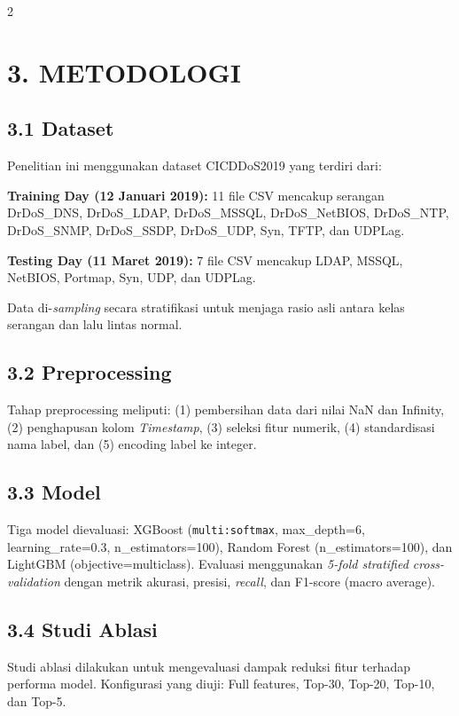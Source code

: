 \documentclass[10pt,a4paper]{article}
\begin{document}
\begin{multicols}{2}
\section*{\textbf{3. METODOLOGI}}

\subsection*{3.1 Dataset}

Penelitian ini menggunakan dataset CICDDoS2019 yang terdiri dari:

\textbf{Training Day (12 Januari 2019):} 11 file CSV mencakup serangan DrDoS\_DNS, DrDoS\_LDAP, DrDoS\_MSSQL, DrDoS\_NetBIOS, DrDoS\_NTP, DrDoS\_SNMP, DrDoS\_SSDP, DrDoS\_UDP, Syn, TFTP, dan UDPLag.

\textbf{Testing Day (11 Maret 2019):} 7 file CSV mencakup LDAP, MSSQL, NetBIOS, Portmap, Syn, UDP, dan UDPLag.

Data di-\textit{sampling} secara stratifikasi untuk menjaga rasio asli antara kelas serangan dan lalu lintas normal.

\subsection*{3.2 Preprocessing}

Tahap preprocessing meliputi: (1) pembersihan data dari nilai NaN dan Infinity, (2) penghapusan kolom \textit{Timestamp}, (3) seleksi fitur numerik, (4) standardisasi nama label, dan (5) encoding label ke integer.

\subsection*{3.3 Model}

Tiga model dievaluasi: XGBoost (\texttt{multi:softmax}, max\_depth=6, learning\_rate=0.3, n\_estimators=100), Random Forest (n\_estimators=100), dan LightGBM (objective=multiclass). Evaluasi menggunakan \textit{5-fold stratified cross-validation} dengan metrik akurasi, presisi, \textit{recall}, dan F1-score (macro average).

\subsection*{3.4 Studi Ablasi}

Studi ablasi dilakukan untuk mengevaluasi dampak reduksi fitur terhadap performa model. Konfigurasi yang diuji: Full features, Top-30, Top-20, Top-10, dan Top-5.


\end{multicols}
\end{document}
